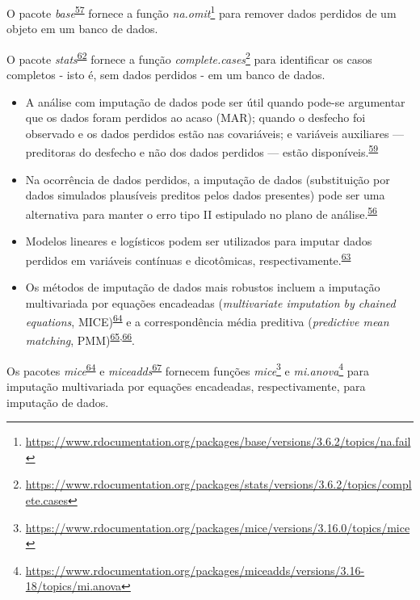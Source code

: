 \documentclass[
  a4paper,
]{book}
\renewcommand{\href}[2]{#2\footnote{\url{#1}}}
\newenvironment{infobox}[1]
  {
  \begin{itemize}
  \renewcommand{\labelitemi}{
    \raisebox{-.7\height}[0pt][0pt]{
      {\setkeys{Gin}{width=3em,keepaspectratio}
        \texttt{[image: \#1]}}
    }
  }
  \setlength{\fboxsep}{1em}
  \begin{blackbox}
  \item
  }
  {
  \end{blackbox}
  \end{itemize}
  }
\begin{document}
\begin{infobox}{images/Rlogo}
O pacote \emph{base}\textsuperscript{\protect\hyperlink{ref-base-2}{57}} fornece a função \href{https://www.rdocumentation.org/packages/base/versions/3.6.2/topics/na.fail}{\emph{na.omit}} para remover dados perdidos de um objeto em um banco de dados.

\end{infobox}

\begin{infobox}{images/Rlogo}
O pacote \emph{stats}\textsuperscript{\protect\hyperlink{ref-stats}{62}} fornece a função \href{https://www.rdocumentation.org/packages/stats/versions/3.6.2/topics/complete.cases}{\emph{complete.cases}} para identificar os casos completos - isto é, sem dados perdidos - em um banco de dados.

\end{infobox}

\begin{itemize}
\item
  A análise com imputação de dados pode ser útil quando pode-se argumentar que os dados foram perdidos ao acaso (MAR); quando o desfecho foi observado e os dados perdidos estão nas covariáveis; e variáveis auxiliares --- preditoras do desfecho e não dos dados perdidos --- estão disponíveis.\textsuperscript{\protect\hyperlink{ref-carpenter2021}{59}}
\item
  Na ocorrência de dados perdidos, a imputação de dados (substituição por dados simulados plausíveis preditos pelos dados presentes) pode ser uma alternativa para manter o erro tipo II estipulado no plano de análise.\textsuperscript{\protect\hyperlink{ref-Altman2007}{56}}
\item
  Modelos lineares e logísticos podem ser utilizados para imputar dados perdidos em variáveis contínuas e dicotômicas, respectivamente.\textsuperscript{\protect\hyperlink{ref-austin2023}{63}}
\item
  Os métodos de imputação de dados mais robustos incluem a imputação multivariada por equações encadeadas (\emph{multivariate imputation by chained equations}, MICE)\textsuperscript{\protect\hyperlink{ref-mice}{64}} e a correspondência média preditiva (\emph{predictive mean matching}, PMM)\textsuperscript{\protect\hyperlink{ref-rubin1986}{65},\protect\hyperlink{ref-little1988a}{66}}.
\end{itemize}

\begin{infobox}{images/Rlogo}
Os pacotes \emph{mice}\textsuperscript{\protect\hyperlink{ref-mice}{64}} e \emph{miceadds}\textsuperscript{\protect\hyperlink{ref-miceadds}{67}} fornecem funções \href{https://www.rdocumentation.org/packages/mice/versions/3.16.0/topics/mice}{\emph{mice}} e \href{https://www.rdocumentation.org/packages/miceadds/versions/3.16-18/topics/mi.anova}{\emph{mi.anova}} para imputação multivariada por equações encadeadas, respectivamente, para imputação de dados.

\end{infobox}
\end{document}
